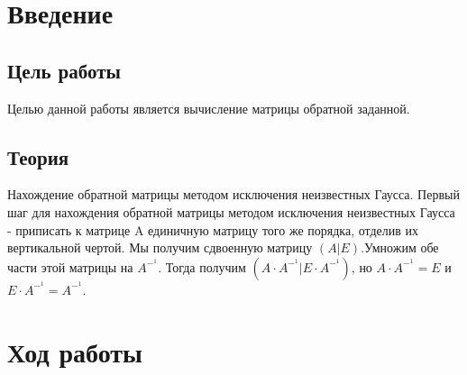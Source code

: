 \documentclass[12pt,a4paper]{scrartcl}
\begin{document}
\section{Введение}
\label{sec:intro}


\subsection{Цель работы}
Целью данной работы является вычисление матрицы обратной заданной. 

\subsection{Теория}
Нахождение обратной матрицы методом исключения неизвестных Гаусса. Первый шаг для нахождения обратной матрицы методом исключения неизвестных Гаусса - приписать к матрице A единичную матрицу того же порядка, отделив их вертикальной чертой. Мы получим сдвоенную матрицу $(A|E)$.Умножим обе части этой матрицы на  $A^-^1$. Тогда получим $(A\cdot A^-^1|E\cdot A^-^1)$, но $A\cdot A^-^1=E$ и $E\cdot A^-^1=A^-^1$.


\section{Ход работы}
\end{document}
